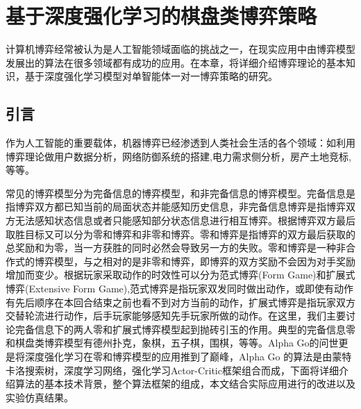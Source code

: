 \chapter{基于深度强化学习的棋盘类博弈策略}
计算机博弈经常被认为是人工智能领域面临的挑战之一，在现实应用中由博弈模型发展出的算法在很多领域都有成功的应用。在本章，将详细介绍博弈理论的基本知识，基于深度强化学习模型对单智能体一对一博弈策略的研究。
\section{引言}
作为人工智能的重要载体，机器博弈已经渗透到人类社会生活的各个领域：如利用博弈理论做用户数据分析\cite{吴诚2017基于博弈论的大用户直购电双边决策研究}，网络防御系统的搭建\cite{许晓燕2018基于博弈模型的网络防御},电力需求侧分析\cite{刘晓峰2018博弈论在电力需求侧的应用研究综述}，房产土地竞标\cite{朱传军2011基于模糊测度与模糊积分的房地产评估方法与应用},等等。

常见的博弈模型分为完备信息的博弈模型，和非完备信息的博弈模型。完备信息是指博弈双方都已知当前的局面状态并能感知历史信息，非完备信息博弈是指博弈双方无法感知状态信息或者只能感知部分状态信息进行相互博弈。根据博弈双方最后取胜目标又可以分为零和博弈和非零和博弈。零和博弈是指博弈的双方最后获取的总奖励和为零，当一方获胜的同时必然会导致另一方的失败。零和博弈是一种非合作式的博弈模型，与之相对的是非零和博弈，即博弈的双方奖励不会因为对手奖励增加而变少。根据玩家采取动作的时效性可以分为范式博弈(Form Game)和扩展式博弈(Extensive Form Game),范式博弈是指玩家双发同时做出动作，或即使有动作有先后顺序在本回合结束之前也看不到对方当前的动作，扩展式博弈是指玩家双方交替轮流进行动作，后手玩家能够感知先手玩家所做的动作。在这里，我们主要讨论完备信息下的两人零和扩展式博弈模型起到抛砖引玉的作用。典型的完备信息零和棋盘类博弈模型有德州扑克，象棋，五子棋，围棋，等等。Alpha Go的问世更是将深度强化学习在零和博弈模型的应用推到了巅峰，Alpha Go 的算法是由蒙特卡洛搜索树，深度学习网络，强化学习Actor-Critic框架组合而成，下面将详细介绍算法的基本技术背景，整个算法框架的组成，本文结合实际应用进行的改进以及实验仿真结果。
